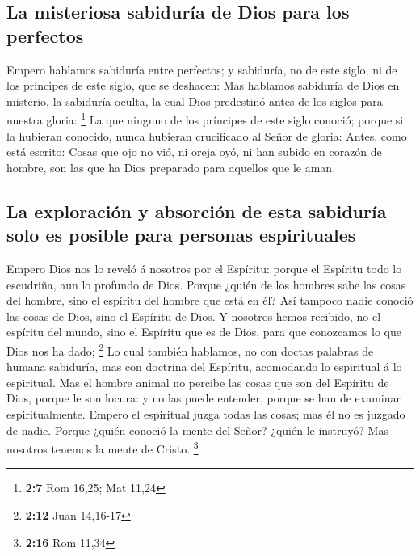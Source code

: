 \hypertarget{la-misteriosa-sabiduruxeda-de-dios-para-los-perfectos}{%
\subsection{La misteriosa sabiduría de Dios para los
perfectos}\label{la-misteriosa-sabiduruxeda-de-dios-para-los-perfectos}}

 Empero hablamos sabiduría entre perfectos; y sabiduría, no
de este siglo, ni de los príncipes de este siglo, que se deshacen:
 Mas hablamos sabiduría de Dios en misterio, la sabiduría
oculta, la cual Dios predestinó antes de los siglos para nuestra gloria:
\footnote{\textbf{2:7} Rom 16,25; Mat 11,24}  La que ninguno
de los príncipes de este siglo conoció; porque si la hubieran conocido,
nunca hubieran crucificado al Señor de gloria:  Antes, como
está escrito: Cosas que ojo no vió, ni oreja oyó, ni han subido en
corazón de hombre, son las que ha Dios preparado para aquellos que le
aman.

\hypertarget{la-exploraciuxf3n-y-absorciuxf3n-de-esta-sabiduruxeda-solo-es-posible-para-personas-espirituales}{%
\subsection{La exploración y absorción de esta sabiduría solo es posible
para personas
espirituales}\label{la-exploraciuxf3n-y-absorciuxf3n-de-esta-sabiduruxeda-solo-es-posible-para-personas-espirituales}}

 Empero Dios nos lo reveló á nosotros por el Espíritu:
porque el Espíritu todo lo escudriña, aun lo profundo de Dios.
 Porque ¿quién de los hombres sabe las cosas del hombre,
sino el espíritu del hombre que está en él? Así tampoco nadie conoció
las cosas de Dios, sino el Espíritu de Dios.  Y nosotros
hemos recibido, no el espíritu del mundo, sino el Espíritu que es de
Dios, para que conozcamos lo que Dios nos ha dado; \footnote{\textbf{2:12}
  Juan 14,16-17}  Lo cual también hablamos, no con doctas
palabras de humana sabiduría, mas con doctrina del Espíritu, acomodando
lo espiritual á lo espiritual.  Mas el hombre animal no
percibe las cosas que son del Espíritu de Dios, porque le son locura: y
no las puede entender, porque se han de examinar espiritualmente.
 Empero el espiritual juzga todas las cosas; mas él no es
juzgado de nadie.  Porque ¿quién conoció la mente del
Señor? ¿quién le instruyó? Mas nosotros tenemos la mente de Cristo.
\footnote{\textbf{2:16} Rom 11,34}

